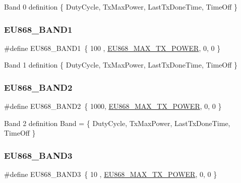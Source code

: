 Band 0 definition \{ Duty\+Cycle, Tx\+Max\+Power, Last\+Tx\+Done\+Time, Time\+Off \} \mbox{\label{group__REGIONEU868_ga8a18e253f46e534ff0ee00c0c21b4211}} 
\subsubsection{\texorpdfstring{E\+U868\+\_\+\+B\+A\+N\+D1}{EU868\_BAND1}}
{\footnotesize\ttfamily \#define E\+U868\+\_\+\+B\+A\+N\+D1~\{ 100 , \hyperlink{group__REGIONEU868_ga39e338c7f8454f594302811f61d9560d}{E\+U868\+\_\+\+M\+A\+X\+\_\+\+T\+X\+\_\+\+P\+O\+W\+ER}, 0,  0 \}}

Band 1 definition \{ Duty\+Cycle, Tx\+Max\+Power, Last\+Tx\+Done\+Time, Time\+Off \} \mbox{\label{group__REGIONEU868_gaf5b8aba834ede7487acbff80b6c30b36}} 
\subsubsection{\texorpdfstring{E\+U868\+\_\+\+B\+A\+N\+D2}{EU868\_BAND2}}
{\footnotesize\ttfamily \#define E\+U868\+\_\+\+B\+A\+N\+D2~\{ 1000, \hyperlink{group__REGIONEU868_ga39e338c7f8454f594302811f61d9560d}{E\+U868\+\_\+\+M\+A\+X\+\_\+\+T\+X\+\_\+\+P\+O\+W\+ER}, 0,  0 \}}

Band 2 definition Band = \{ Duty\+Cycle, Tx\+Max\+Power, Last\+Tx\+Done\+Time, Time\+Off \} \mbox{\label{group__REGIONEU868_gab7e01f2131642f135babcd1189d429d3}} 
\subsubsection{\texorpdfstring{E\+U868\+\_\+\+B\+A\+N\+D3}{EU868\_BAND3}}
{\footnotesize\ttfamily \#define E\+U868\+\_\+\+B\+A\+N\+D3~\{ 10  , \hyperlink{group__REGIONEU868_ga39e338c7f8454f594302811f61d9560d}{E\+U868\+\_\+\+M\+A\+X\+\_\+\+T\+X\+\_\+\+P\+O\+W\+ER}, 0,  0 \}}

